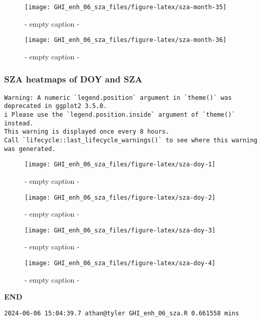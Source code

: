 \documentclass[
  10pt,
  a4paper,oneside]{article}
\begin{document}
\begin{figure}[H]

{\centering \texttt{[image: GHI\_enh\_06\_sza\_files/figure-latex/sza-month-35]} 

}

\caption{ - empty caption - }\label{fig:sza-month-35}
\end{figure}
\begin{figure}[H]

{\centering \texttt{[image: GHI\_enh\_06\_sza\_files/figure-latex/sza-month-36]} 

}

\caption{ - empty caption - }\label{fig:sza-month-36}
\end{figure}

\newpage
\FloatBarrier

\hypertarget{sza-heatmaps-of-doy-and-sza}{%
\subsubsection{SZA heatmaps of DOY and SZA}\label{sza-heatmaps-of-doy-and-sza}}

\begin{verbatim}
Warning: A numeric `legend.position` argument in `theme()` was deprecated in ggplot2 3.5.0.
i Please use the `legend.position.inside` argument of `theme()` instead.
This warning is displayed once every 8 hours.
Call `lifecycle::last_lifecycle_warnings()` to see where this warning was generated.
\end{verbatim}

\begin{figure}[H]

{\centering \texttt{[image: GHI\_enh\_06\_sza\_files/figure-latex/sza-doy-1]} 

}

\caption{ - empty caption - }\label{fig:sza-doy-1}
\end{figure}
\begin{figure}[H]

{\centering \texttt{[image: GHI\_enh\_06\_sza\_files/figure-latex/sza-doy-2]} 

}

\caption{ - empty caption - }\label{fig:sza-doy-2}
\end{figure}
\begin{figure}[H]

{\centering \texttt{[image: GHI\_enh\_06\_sza\_files/figure-latex/sza-doy-3]} 

}

\caption{ - empty caption - }\label{fig:sza-doy-3}
\end{figure}
\begin{figure}[H]

{\centering \texttt{[image: GHI\_enh\_06\_sza\_files/figure-latex/sza-doy-4]} 

}

\caption{ - empty caption - }\label{fig:sza-doy-4}
\end{figure}

\textbf{END}

\begin{verbatim}
2024-06-06 15:04:39.7 athan@tyler GHI_enh_06_sza.R 0.661558 mins
\end{verbatim}
\end{document}
